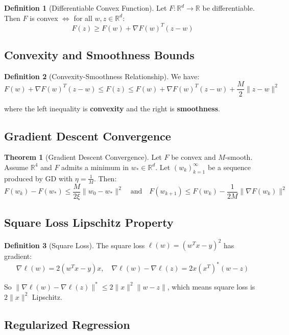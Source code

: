 \documentclass[12pt,a4paper]{article}
\theoremstyle{definition}
\newtheorem{definition}{Definition}[section]
\newtheorem{theorem}{Theorem}[section]
\begin{document}
\begin{definition}[Differentiable Convex Function]
Let $F: \mathbb{R}^d \to \mathbb{R}$ be differentiable. Then $F$ is convex $\Leftrightarrow$ for all $w, z \in \mathbb{R}^d$:
\[
F(z) \geq F(w) + \nabla F(w)^T (z - w)
\]
\end{definition}

\subsection{Convexity and Smoothness Bounds}

\begin{definition}[Convexity-Smoothness Relationship]
We have:
\[
F(w) + \nabla F(w)^T (z - w) \leq F(z) \leq F(w) + \nabla F(w)^T (z - w) + \frac{M}{2} \|z - w\|^2
\]

where the left inequality is \textbf{convexity} and the right is \textbf{smoothness}.
\end{definition}

\subsection{Gradient Descent Convergence}

\begin{theorem}[Gradient Descent Convergence]
Let $F$ be convex and $M$-smooth. Assume $\mathbb{R}^4$ and $F$ admits a minimum in $w_* \in \mathbb{R}^d$. Let $(w_k)_{k=1}^{\infty}$ be a sequence produced by GD with $\eta = \frac{1}{M}$. Then:
\[
F(w_k) - F(w_*) \leq \frac{M}{2\xi} \|w_0 - w_*\|^2 \quad \text{and} \quad F(w_{k+1}) \leq F(w_k) - \frac{1}{2M}\|\nabla F(w_k)\|^2
\]
\end{theorem}

\subsection{Square Loss Lipschitz Property}

\begin{definition}[Square Loss]
The square loss $\ell(w) = (w^T x - y)^2$ has gradient:
\[
\nabla \ell(w) = 2(w^T x - y)x, \quad \nabla \ell(w) - \nabla \ell(z) = 2x(x^T)^* (w - z)
\]

So $\|\nabla \ell(w) - \nabla \ell(z)\|^* \leq 2 \|x\|^2 \|w - z\|$, which means square loss is $2\|x\|^2$ Lipschitz.
\end{definition}

\subsection{Regularized Regression}
\end{document}
